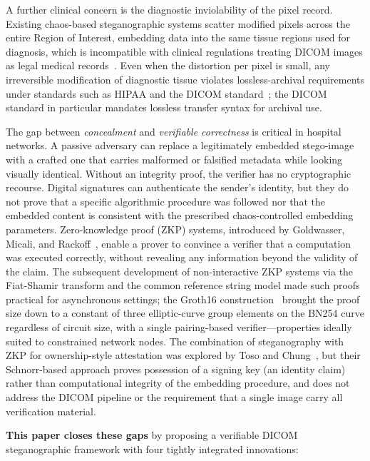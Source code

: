 \documentclass{jstarticle}
\begin{document}
A further clinical concern is the diagnostic inviolability of the pixel record.
Existing chaos-based steganographic systems scatter modified pixels across the entire Region of Interest, embedding data into the same tissue regions used for diagnosis, which is incompatible with clinical regulations treating DICOM images as legal medical records~\cite{b14}.
Even when the distortion per pixel is small, any irreversible modification of diagnostic tissue violates lossless-archival requirements under standards such as HIPAA and the DICOM standard~\cite{b14}; the DICOM standard in particular mandates lossless transfer syntax for archival use.

The gap between \emph{concealment} and \emph{verifiable correctness} is critical in hospital networks.
A passive adversary can replace a legitimately embedded stego-image with a crafted one that carries malformed or falsified metadata while looking visually identical.
Without an integrity proof, the verifier has no cryptographic recourse.
Digital signatures can authenticate the sender's identity, but they do not prove that a specific algorithmic procedure was followed nor that the embedded content is consistent with the prescribed chaos-controlled embedding parameters.
Zero-knowledge proof (ZKP) systems, introduced by Goldwasser, Micali, and Rackoff~\cite{b7}, enable a prover to convince a verifier that a computation was executed correctly, without revealing any information beyond the validity of the claim.
The subsequent development of non-interactive ZKP systems via the Fiat-Shamir transform and the common reference string model made such proofs practical for asynchronous settings; the Groth16 construction~\cite{b8} brought the proof size down to a constant of three elliptic-curve group elements on the BN254 curve regardless of circuit size, with a single pairing-based verifier---properties ideally suited to constrained network nodes.
The combination of steganography with ZKP for ownership-style attestation was explored by Toso and Chung~\cite{b6}, but their Schnorr-based approach proves possession of a signing key (an identity claim) rather than computational integrity of the embedding procedure, and does not address the DICOM pipeline or the requirement that a single image carry all verification material.

\textbf{This paper closes these gaps} by proposing a verifiable DICOM
steganographic framework with four tightly integrated innovations:
\end{document}

